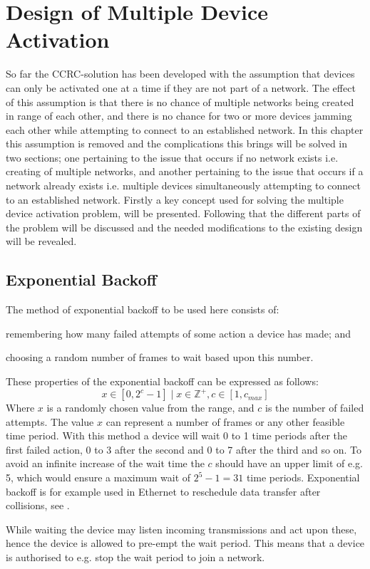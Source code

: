 \chapter{Design of Multiple Device Activation}\label{chap:MDA-CCRC}
So far the CCRC-solution has been developed with the assumption that devices can only be activated one at a time if they are not part of a network.
The effect of this assumption is that there is no chance of multiple networks being created in range of each other, and there is no chance for two or more devices jamming each other while attempting to connect to an established network.
In this chapter this assumption is removed and the complications this brings will be solved in two sections; one pertaining to the issue that occurs if no network exists i.e. creating of multiple networks, and another pertaining to the issue that occurs if a network already exists i.e. multiple devices simultaneously attempting to connect to an established network.
Firstly a key concept used for solving the multiple device activation problem, will be presented.
Following that the different parts of the problem will be discussed and the needed modifications to the existing design will be revealed.

\section{Exponential Backoff} %
\label{sec:exponential_backoff}
The method of exponential backoff to be used here consists of:
\begin{enumerate*}[label=\itshape \alph*\upshape)]
    \item remembering how many failed attempts of some action a device has made; and
    \item choosing a random number of frames to wait based upon this number.   
\end{enumerate*}
These properties of the exponential backoff can be expressed as follows:
\begin{equation}
     x \in [0, 2^c - 1] \mid x \in \mathbb{Z}^+, c \in [1,c_{max}]
\end{equation}
Where $x$ is a randomly chosen value from the range, and $c$ is the number of failed attempts. 
The value $x$ can represent a number of frames or any other feasible time period.
With this method a device will wait 0 to 1 time periods after the first failed action, 0 to 3 after the second and 0 to 7 after the third and so on. To avoid an infinite increase of the wait time the $c$ should have an upper limit of e.g. 5, which would ensure a maximum wait of $2^5-1 = 31$ time periods.
Exponential backoff is for example used in Ethernet to reschedule data transfer after collisions, see \citep{Ebackoff}.

While waiting the device may listen incoming transmissions and act upon these, hence the device is allowed to pre-empt the wait period.
This means that a device is authorised to e.g. stop the wait period to join a network. 



